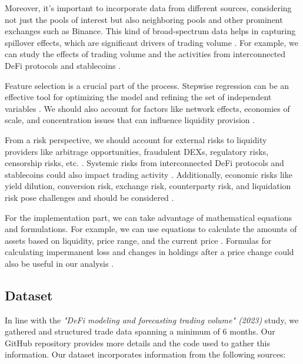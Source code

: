 \documentclass{article}
\begin{document}
Moreover, it's important to incorporate data from different sources, considering not just the pools of interest but also neighboring pools and other prominent exchanges such as Binance. This kind of broad-spectrum data helps in capturing spillover effects, which are significant drivers of trading volume \cite{Miori2023}. For example, we can study the effects of trading volume and the activities from interconnected DeFi protocols and stablecoins \cite{Miori2022}.

Feature selection is a crucial part of the process. Stepwise regression can be an effective tool for optimizing the model and refining the set of independent variables \cite{Miori2023}. We should also account for factors like network effects, economies of scale, and concentration issues that can influence liquidity provision \cite{Makarov2022, Miori2022}.

From a risk perspective, we should account for external risks to liquidity providers like arbitrage opportunities, fraudulent DEXs, regulatory risks, censorship risks, etc. \cite{Aigner2021}. Systemic risks from interconnected DeFi protocols and stablecoins could also impact trading activity \cite{Makarov2022}. Additionally, economic risks like yield dilution, conversion risk, exchange risk, counterparty risk, and liquidation risk pose challenges and should be considered \cite{Xu2023}.

For the implementation part, we can take advantage of mathematical equations and formulations. For example, we can use equations to calculate the amounts of assets based on liquidity, price range, and the current price \cite{Elsts2021}. Formulas for calculating impermanent loss and changes in holdings after a price change could also be useful in our analysis \cite{Elsts2021, Aigner2021, Heimbach2022}.

\subsection{\textbf{Dataset}}

In line with the \textit{"DeFi modeling and forecasting trading volume" (2023)} study\cite{Miori2023}, we gathered and structured trade data spanning a minimum of 6 months. Our GitHub repository provides more details and the code used to gather this information\cite{TeamRepo}. Our dataset incorporates information from the following sources:
\end{document}
